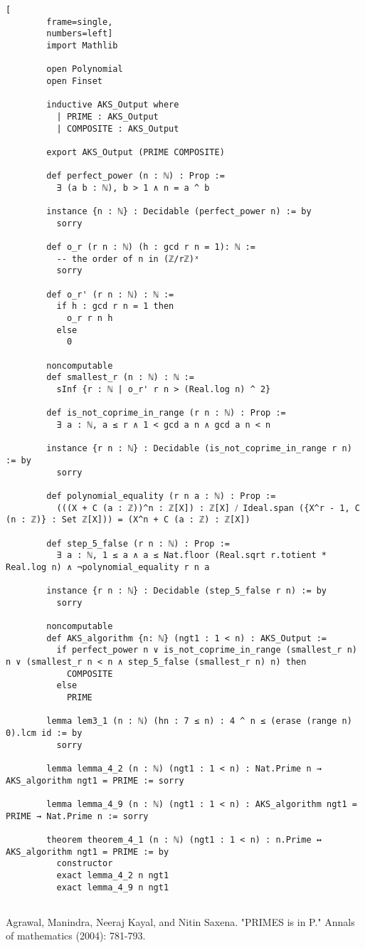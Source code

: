 \documentclass[10pt,a4paper]{article}
\newcommand{\0}{\textbf{0}}
\begin{document}
	\begin{lstlisting}[
		frame=single,
		numbers=left]
		import Mathlib

		open Polynomial
		open Finset
		
		inductive AKS_Output where
		  | PRIME : AKS_Output
		  | COMPOSITE : AKS_Output
		
		export AKS_Output (PRIME COMPOSITE)
		
		def perfect_power (n : ℕ) : Prop :=
		  ∃ (a b : ℕ), b > 1 ∧ n = a ^ b
		
		instance {n : ℕ} : Decidable (perfect_power n) := by
		  sorry
		
		def o_r (r n : ℕ) (h : gcd r n = 1): ℕ :=
		  -- the order of n in (ℤ/rℤ)ˣ
		  sorry
		
		def o_r' (r n : ℕ) : ℕ :=
		  if h : gcd r n = 1 then
			o_r r n h
		  else
			0
		
		noncomputable
		def smallest_r (n : ℕ) : ℕ :=
		  sInf {r : ℕ | o_r' r n > (Real.log n) ^ 2}
		
		def is_not_coprime_in_range (r n : ℕ) : Prop :=
		  ∃ a : ℕ, a ≤ r ∧ 1 < gcd a n ∧ gcd a n < n
		
		instance {r n : ℕ} : Decidable (is_not_coprime_in_range r n) := by
		  sorry
		
		def polynomial_equality (r n a : ℕ) : Prop :=
		  (((X + C (a : ℤ))^n : ℤ[X]) : ℤ[X] ⧸ Ideal.span ({X^r - 1, C (n : ℤ)} : Set ℤ[X])) = (X^n + C (a : ℤ) : ℤ[X])
		
		def step_5_false (r n : ℕ) : Prop :=
		  ∃ a : ℕ, 1 ≤ a ∧ a ≤ Nat.floor (Real.sqrt r.totient * Real.log n) ∧ ¬polynomial_equality r n a
		
		instance {r n : ℕ} : Decidable (step_5_false r n) := by
		  sorry
		
		noncomputable
		def AKS_algorithm {n: ℕ} (ngt1 : 1 < n) : AKS_Output :=
		  if perfect_power n ∨ is_not_coprime_in_range (smallest_r n) n ∨ (smallest_r n < n ∧ step_5_false (smallest_r n) n) then
			COMPOSITE
		  else
			PRIME
		
		lemma lem3_1 (n : ℕ) (hn : 7 ≤ n) : 4 ^ n ≤ (erase (range n) 0).lcm id := by
		  sorry
		
		lemma lemma_4_2 (n : ℕ) (ngt1 : 1 < n) : Nat.Prime n → AKS_algorithm ngt1 = PRIME := sorry
		
		lemma lemma_4_9 (n : ℕ) (ngt1 : 1 < n) : AKS_algorithm ngt1 = PRIME → Nat.Prime n := sorry
		
		theorem theorem_4_1 (n : ℕ) (ngt1 : 1 < n) : n.Prime ↔ AKS_algorithm ngt1 = PRIME := by
		  constructor
		  exact lemma_4_2 n ngt1
		  exact lemma_4_9 n ngt1
					
	\end{lstlisting}
	
	
	
	\begin{thebibliography}{0}
		Agrawal, Manindra, Neeraj Kayal, and Nitin Saxena. "PRIMES is in P." Annals of mathematics (2004): 781-793.
	\end{thebibliography}
	
\end{document}
